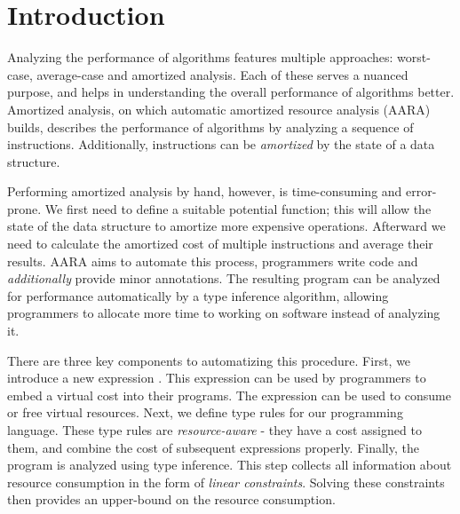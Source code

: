 \chapter{Introduction}\label{chap:introduction}

Analyzing the performance of algorithms features multiple approaches: worst-case, average-case and amortized analysis. Each of these serves a nuanced purpose, and helps in understanding the overall performance of algorithms better. Amortized analysis, on which automatic amortized resource analysis (AARA) builds, describes the performance of algorithms by analyzing a sequence of instructions. Additionally, instructions can be \emph{amortized} by the state of a data structure. 

Performing amortized analysis by hand, however, is time-consuming and error-prone. We first need to define a suitable potential function; this will allow the state of the data structure to amortize more expensive operations. Afterward we need to calculate the amortized cost of multiple instructions and average their results. AARA aims to automate this process, programmers write code and \emph{additionally} provide minor annotations. The resulting program can be analyzed for performance automatically by a type inference algorithm, allowing programmers to allocate more time to working on software instead of analyzing it. 

There are three key components to automatizing this procedure. First, we introduce a new expression . This expression can be used by programmers to embed a virtual cost into their programs. The \tick{} expression can be used to consume or free virtual resources. Next, we define type rules for our programming language. These type rules are \emph{resource-aware} - they have a cost assigned to them, and combine the cost of subsequent expressions properly. Finally, the program is analyzed using type inference. This step collects all information about resource consumption in the form of \emph{linear constraints}. Solving these constraints then provides an upper-bound on the resource consumption.
